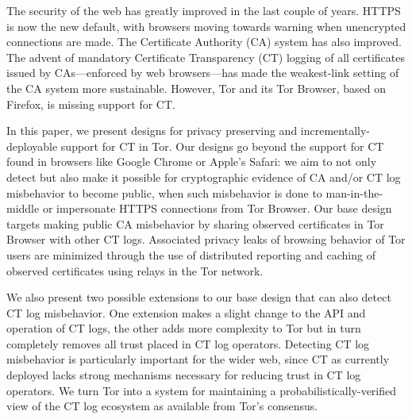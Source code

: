 The security of the web has greatly improved in the last couple of years. HTTPS
is now the new default, with browsers moving towards warning when unencrypted
connections are made. The Certificate Authority (CA) system has also improved.
The advent of mandatory Certificate Transparency (CT) logging of all
certificates issued by CAs---enforced by web browsers---has made the
weakest-link setting of the CA system more sustainable. However, Tor and its Tor
Browser, based on Firefox, is missing support for CT.

In this paper, we present designs for privacy preserving and
incrementally-deployable support for CT in Tor. Our designs go beyond the
support for CT found in browsers like Google Chrome or Apple's Safari: we aim to
not only detect but also make it possible for cryptographic evidence of CA
and/or CT log misbehavior to become public, when such misbehavior is done to
man-in-the-middle or impersonate HTTPS connections from Tor Browser. Our base
design targets making public CA misbehavior by sharing observed certificates in
Tor Browser with other CT logs. Associated privacy leaks of browsing behavior of
Tor users are minimized through the use of distributed reporting and caching of
observed certificates using relays in the Tor network.

We also present two possible extensions to our base design that can also detect
CT log misbehavior. One extension makes a slight change to the API and operation
of CT logs, the other adds more complexity to Tor but in turn completely removes
all trust placed in CT log operators. Detecting CT log misbehavior is
particularly important for the wider web, since CT as currently deployed lacks
strong mechanisms necessary for reducing trust in CT log operators.
We turn Tor into a system for maintaining a probabilistically-verified view of
the CT log ecosystem as available from Tor’s consensus.
